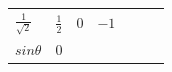 {{\begin{center}
\begin{tabular}[t]{|l|l|l|l|l|l|l|}
    
        
                \begin{math}\frac{1}{\sqrt{2}}\end{math}
               &
    
    
        
                \begin{math}\frac{1}{2}\end{math}
               &
    
    
        0 &
    
    
        
                \begin{math}-1\end{math}
     \tabularnewline\cline{1-1}\cline{2-2}\cline{3-3}\cline{4-4}\cline{5-5}\cline{6-6}\cline{7-7}
    
    
        
                \begin{math}sin\theta \end{math}
               &
    
    
        0 &
    

\end{tabular}
\end{center}}}
